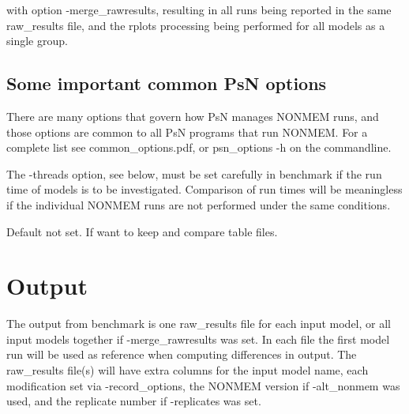 \begin{optionlist}
with option -merge\_rawresults, resulting in all runs being reported in the same raw\_results file,
and the rplots processing being performed for all models as a single group.
\nextopt
\end{optionlist}

\subsection{Some important common PsN options}
There are many options that govern how PsN manages NONMEM runs, and
those options are common to all PsN programs that run NONMEM.
For a complete list see common\_options.pdf, 
or psn\_options -h on the commandline.

The -threads option, see below, must be set carefully in benchmark if the run time
of models is to be investigated. Comparison of run times will be meaningless
if the individual NONMEM runs are not performed under the same conditions.

\begin{optionlist}
Default not set. If want to keep and compare table files.
\end{optionlist}


\section{Output}
The output from benchmark is
one raw\_results file for each input model, or all input models together if -merge\_rawresults was set.
In each file the first model run will be used as reference when computing differences in output.
The raw\_results file(s) will have extra columns for the input model name, each
modification set via -record\_options, the NONMEM version if -alt\_nonmem was used, and the replicate
number if -replicates was set.




